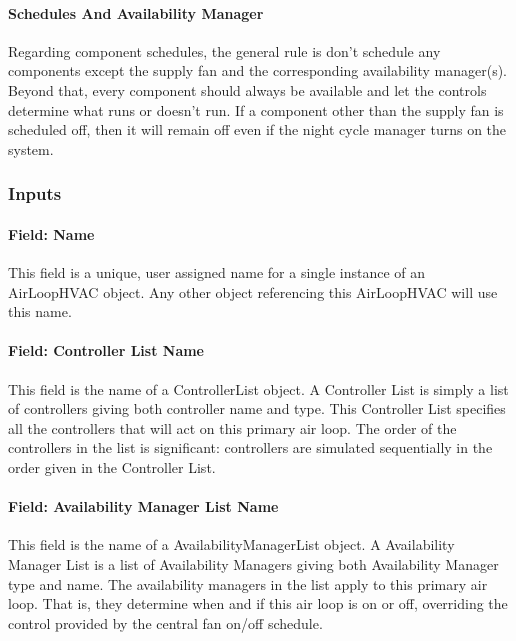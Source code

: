 \paragraph{Schedules And Availability Manager}\label{schedules-and-availability-manager}
Regarding component schedules, the general rule is don't schedule any components except the supply fan and the corresponding availability manager(s). Beyond that, every component should always be available and let the controls determine what runs or doesn't run. If a component other than the supply fan is scheduled off, then it will remain off even if the night cycle manager turns on the system.

\subsubsection{Inputs}\label{inputs-002}

\paragraph{Field: Name}\label{field-name-002}

This field is a unique, user assigned name for a single instance of an AirLoopHVAC object. Any other object referencing this AirLoopHVAC will use this name.

\paragraph{Field: Controller List Name}\label{field-controller-list-name}

This field is the name of a ControllerList object. A Controller List is simply a list of controllers giving both controller name and type. This Controller List specifies all the controllers that will act on this primary air loop. The order of the controllers in the list is significant: controllers are simulated sequentially in the order given in the Controller List.

\paragraph{Field: Availability Manager List Name}\label{field-availability-manager-list-name}

This field is the name of a AvailabilityManagerList object. A Availability Manager List is a list of Availability Managers giving both Availability Manager type and name. The availability managers in the list apply to this primary air loop. That is, they determine when and if this air loop is on or off, overriding the control provided by the central fan on/off schedule.

